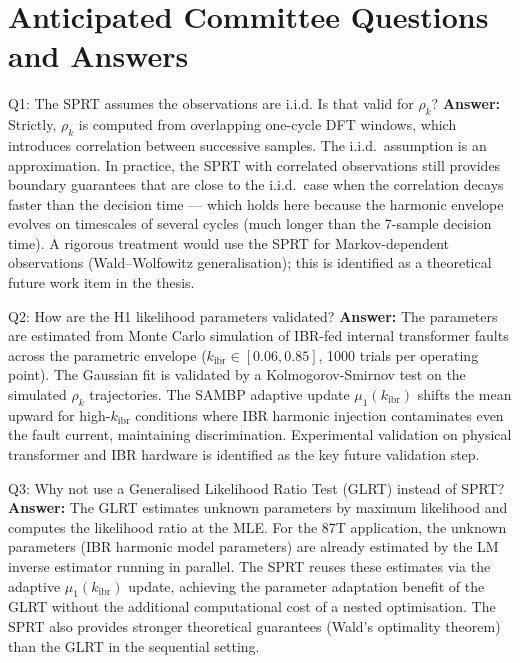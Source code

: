 \documentclass[12pt,a4paper]{article}
\newcommand{\kibr}{k_\mathrm{ibr}}
\begin{document}
\section{Anticipated Committee Questions and Answers}

\begin{keybox}{Q1: The SPRT assumes the observations are i.i.d. Is that valid for $\rho_k$?}
\textbf{Answer:} Strictly, $\rho_k$ is computed from overlapping one-cycle DFT windows, which introduces correlation between successive samples. The i.i.d.\ assumption is an approximation. In practice, the SPRT with correlated observations still provides boundary guarantees that are close to the i.i.d.\ case when the correlation decays faster than the decision time --- which holds here because the harmonic envelope evolves on timescales of several cycles (much longer than the 7-sample decision time). A rigorous treatment would use the SPRT for Markov-dependent observations (Wald--Wolfowitz generalisation); this is identified as a theoretical future work item in the thesis.
\end{keybox}

\begin{keybox}{Q2: How are the H1 likelihood parameters validated?}
\textbf{Answer:} The parameters are estimated from Monte Carlo simulation of IBR-fed internal transformer faults across the parametric envelope ($\kibr \in [0.06, 0.85]$, 1000 trials per operating point). The Gaussian fit is validated by a Kolmogorov-Smirnov test on the simulated $\rho_k$ trajectories. The SAMBP adaptive update $\mu_1(\kibr)$ shifts the mean upward for high-$\kibr$ conditions where IBR harmonic injection contaminates even the fault current, maintaining discrimination. Experimental validation on physical transformer and IBR hardware is identified as the key future validation step.
\end{keybox}

\begin{keybox}{Q3: Why not use a Generalised Likelihood Ratio Test (GLRT) instead of SPRT?}
\textbf{Answer:} The GLRT estimates unknown parameters by maximum likelihood and computes the likelihood ratio at the MLE. For the 87T application, the unknown parameters (IBR harmonic model parameters) are already estimated by the LM inverse estimator running in parallel. The SPRT reuses these estimates via the adaptive $\mu_1(\kibr)$ update, achieving the parameter adaptation benefit of the GLRT without the additional computational cost of a nested optimisation. The SPRT also provides stronger theoretical guarantees (Wald's optimality theorem) than the GLRT in the sequential setting.
\end{keybox}
\end{document}
